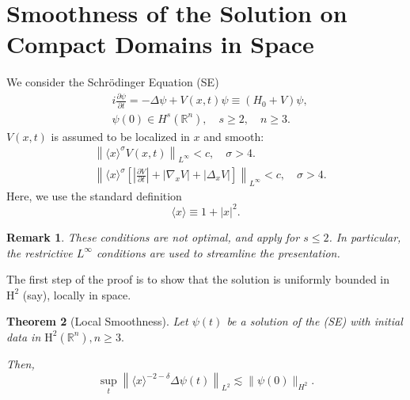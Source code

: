 \documentclass[11pt]{article}
\newtheorem{theorem}{Theorem}[section]
\newtheorem{remark}[theorem]{Remark}
\newcommand\R{\mathbb{R}}
\begin{document}
\section{Smoothness of the Solution on Compact Domains in Space}
We consider the Schr\"odinger Equation (SE)
$$
\begin{aligned}
& i \frac{\partial \psi}{\partial t}=-\Delta \psi+V(x, t) \psi\equiv (H_0+V)\psi, \\
& \psi(0) \in H^{s}(\R^n), \quad s \geqslant 2, \quad n\geq 3.
\end{aligned}
$$
$V(x, t)$ is assumed to be localized in $x$ and smooth:
$$
\begin{aligned}
& \left\|\langle x\rangle^{\sigma} V(x, t)\right\|_{L^{\infty}}< c, \quad \sigma > 4 . \\
& \left\|\langle x\rangle^{\sigma}\left[\left|\frac{\partial V}{\partial t}\right|+\left|\nabla_{x} V\right|+|\Delta_x V|\right]\right\|_{L^{\infty}}< c, \quad \sigma > 4 .
\end{aligned}
$$
Here, we use the standard definition 
$$
\langle x\rangle \equiv 1+|x|^2.
$$
\begin{remark}
These conditions are not optimal, and apply for $s \leq 2$. In particular, the restrictive $L^{\infty}$ conditions are used to streamline the presentation.
\end{remark}

The first step of the proof is to show that the solution is uniformly bounded in $\mathrm{H}^{2}$ (say), locally in space.

\begin{theorem}[Local Smoothness]


 Let $\psi(t)$ be a solution of the (SE) with initial data in $\mathrm{H}^{2}(\R^n), n\geq 3.$

Then,
\[
\sup _{t}\left\|\langle x\rangle^{-2-\delta} \Delta \psi(t)\right\|_{L^{2}} \lesssim\|\psi(0)\|_{H^{2}} .
\]\label{Local1}
\end{theorem}

\end{document}
